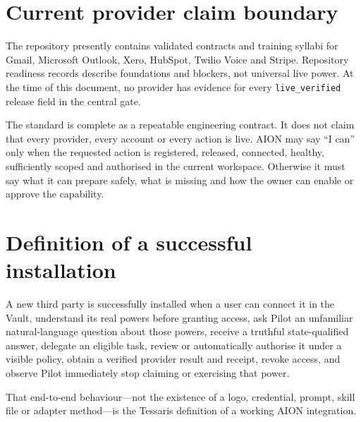 \documentclass[11pt,a4paper]{article}
\newcommand{\code}[1]{\texttt{#1}}
\begin{document}
\section{Current provider claim boundary}

The repository presently contains validated contracts and training syllabi for
Gmail, Microsoft Outlook, Xero, HubSpot, Twilio Voice and Stripe. Repository
readiness records describe foundations and blockers, not universal live power.
At the time of this document, no provider has evidence for every
\code{live\_verified} release field in the central gate.

\begin{truthbox}
The standard is complete as a repeatable engineering contract. It does not
claim that every provider, every account or every action is live. AION may say
``I can'' only when the requested action is registered, released, connected,
healthy, sufficiently scoped and authorised in the current workspace. Otherwise
it must say what it can prepare safely, what is missing and how the owner can
enable or approve the capability.
\end{truthbox}

\section{Definition of a successful installation}

A new third party is successfully installed when a user can connect it in the
Vault, understand its real powers before granting access, ask Pilot an unfamiliar
natural-language question about those powers, receive a truthful state-qualified
answer, delegate an eligible task, review or automatically authorise it under a
visible policy, obtain a verified provider result and receipt, revoke access, and
observe Pilot immediately stop claiming or exercising that power.

That end-to-end behaviour---not the existence of a logo, credential, prompt,
skill file or adapter method---is the Tessaris definition of a working AION
integration.
\end{document}
